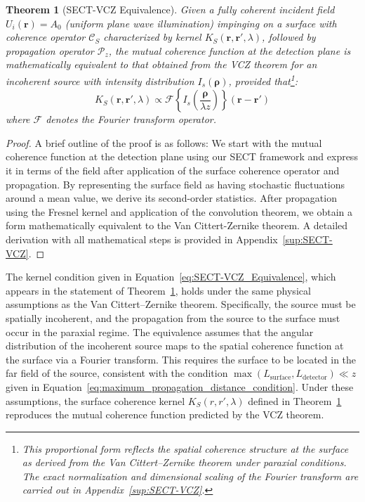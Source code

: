 \documentclass[a4paper,12pt]{article}
\newtheorem{theorem}{Theorem}[section]
\begin{document}
\begin{theorem}[SECT-VCZ Equivalence] \label{thrm:SECT-VCZ_Equivalence}
Given a fully coherent incident field $U_i(\bm{r}) = A_0$ (uniform plane wave illumination) impinging on a 
surface with coherence operator $\mathcal{C}_S$ characterized by kernel $K_S(\bm{r}, \bm{r}', \lambda)$, followed by 
propagation operator $\mathcal{P}_z$, the mutual coherence function at the detection plane is mathematically equivalent 
to that obtained from the VCZ theorem for an incoherent source with intensity distribution $I_s(\bm{\rho})$, 
provided that\footnote{This proportional form reflects the spatial coherence structure at the surface as derived from the Van Cittert–Zernike 
theorem under paraxial conditions. The exact normalization and dimensional scaling of the Fourier transform are 
carried out in Appendix~\ref{sup:SECT-VCZ}.}:
\begin{equation}
K_S(\bm{r}, \bm{r}', \lambda) \propto \mathcal{F}\left\{I_s\left(\frac{\bm{\rho}}{\lambda z}\right)\right\}(\bm{r} - \bm{r}')
\label{eq:SECT-VCZ_Equivalence}
\end{equation}
where $\mathcal{F}$ denotes the Fourier transform operator.
\end{theorem}

\begin{proof}
A brief outline of the proof is as follows: We start with the mutual coherence function at the detection plane using our 
SECT framework and express it in terms of the field after application of the surface coherence operator and propagation. 
By representing the surface field as having stochastic fluctuations around a mean value, we derive its second-order 
statistics. After propagation using the Fresnel kernel and application of the convolution theorem, we obtain a form 
mathematically equivalent to the Van Cittert-Zernike theorem. A detailed derivation with all mathematical steps is 
provided in Appendix~\ref{sup:SECT-VCZ}.
\end{proof}

The kernel condition given in Equation~\ref{eq:SECT-VCZ_Equivalence}, which appears in the statement of 
Theorem~\ref{thrm:SECT-VCZ_Equivalence}, holds under the same physical assumptions as the Van Cittert–Zernike theorem. 
Specifically, the source must be spatially incoherent, and the propagation from the source to the surface must occur in 
the paraxial regime. The equivalence assumes that the angular distribution of the incoherent source maps to the 
spatial coherence function at the surface via a Fourier transform. This requires the surface to be located in the 
far field of the source, consistent with the condition \( \max(L_\text{surface}, L_\text{detector}) \ll z \) given 
in Equation~\ref{eq:maximum_propagation_distance_condition}. 
Under these assumptions, the surface coherence kernel \( K_S(r, r', \lambda) \) defined in 
Theorem~\ref{thrm:SECT-VCZ_Equivalence} reproduces the mutual coherence function predicted by the VCZ theorem.
\end{document}
